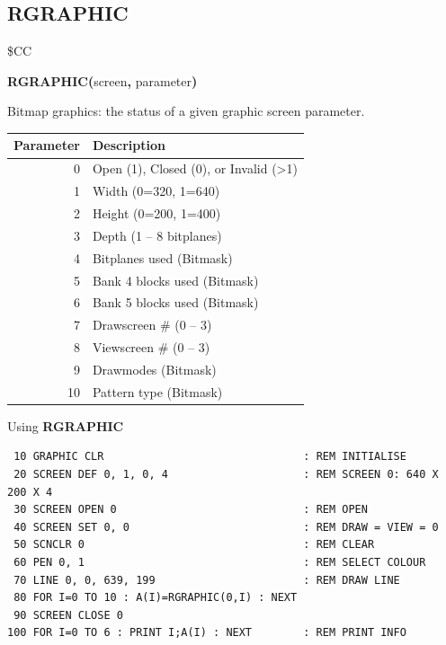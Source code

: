 \subsection{RGRAPHIC}
\begin{description}[leftmargin=2cm,style=nextline]
\item [Token:]    \$CC

\item [Format:]   {\bf RGRAPHIC(}screen{\bf,} parameter{\bf)}

\item [Returns:]  Bitmap graphics: the status of a given graphic screen parameter.

                  \begin{center}
                  {\setlength{\tabcolsep}{1mm}
                  \begin{tabular}{|r|l|}
                  \hline
                  {\bf Parameter} & {\bf Description} \\
                  \hline
                  0  & Open (1), Closed (0), or Invalid (>1) \\
                  1  & Width (0=320, 1=640) \\
                  2  & Height (0=200, 1=400) \\
                  3  & Depth (1 -- 8 bitplanes) \\
                  4  & Bitplanes used (Bitmask) \\
                  5  & Bank 4 blocks used (Bitmask) \\
                  6  & Bank 5 blocks used (Bitmask) \\
                  7  & Drawscreen \# (0 -- 3) \\
                  8  & Viewscreen \# (0 -- 3) \\
                  9  & Drawmodes (Bitmask) \\
                  10 & Pattern type (Bitmask) \\
                  \hline
                  \end{tabular}
                  }
                  \end{center}

\item [Example:]  Using {\bf RGRAPHIC}

\begin{tcolorbox}[colback=black,coltext=white]
\verbatimfont{\codefont}
\begin{verbatim}
 10 GRAPHIC CLR                               : REM INITIALISE
 20 SCREEN DEF 0, 1, 0, 4                     : REM SCREEN 0: 640 X 200 X 4
 30 SCREEN OPEN 0                             : REM OPEN
 40 SCREEN SET 0, 0                           : REM DRAW = VIEW = 0
 50 SCNCLR 0                                  : REM CLEAR
 60 PEN 0, 1                                  : REM SELECT COLOUR
 70 LINE 0, 0, 639, 199                       : REM DRAW LINE
 80 FOR I=0 TO 10 : A(I)=RGRAPHIC(0,I) : NEXT
 90 SCREEN CLOSE 0
100 FOR I=0 TO 6 : PRINT I;A(I) : NEXT        : REM PRINT INFO


\end{verbatim}
\end{tcolorbox}
\end{description}
